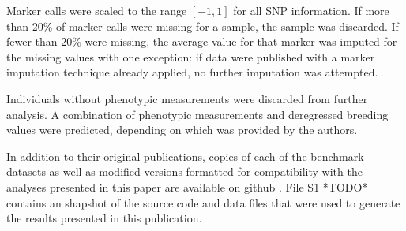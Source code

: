 \ifdefined\showtablesandfigures
\fi

Marker calls were scaled to the range $[-1, 1]$ for all SNP information. If more than 20\% of
marker calls were missing for a sample, the sample was discarded. If fewer than 20\% were missing,
the average value for that marker was imputed for the missing values with one exception: if data were 
published with a marker imputation technique already applied, no further imputation was attempted.

Individuals without phenotypic measurements were discarded from further analysis. A combination of phenotypic 
measurements and deregressed breeding values were predicted, depending on which was provided by the authors.

In addition to their original publications, copies of each of the benchmark datasets as well 
as modified versions formatted for compatibility with the analyses presented in 
this paper are available on github \citep{mcdowell2016}. File S1 *TODO* contains an shapshot of the 
source code and data files that were used to generate the results presented in this publication.

%

